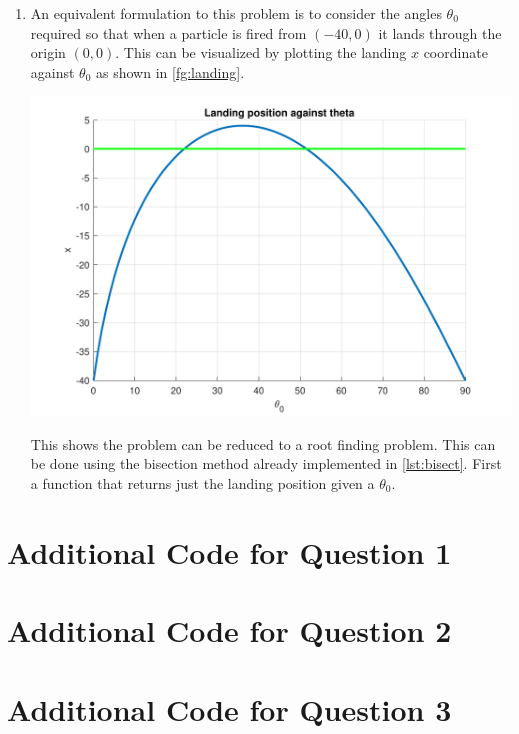 \documentclass[a4paper,11pt]{article}
\begin{document}
\begin{enumerate}
	\item An equivalent formulation to this problem is to consider the angles 
	$\theta_{0}$ required so that when a particle is fired from $(-40,0)$ it 
	lands through the origin $(0,0)$. This can be visualized by plotting the 
	landing $x$ coordinate against $\theta_{0}$ as shown in 
	\autoref{fg:landing}.
	\begin{center}
		\includegraphics[scale=0.7]{images/Q3f.pdf}
		\label{fg:landing}
	\end{center}
	This shows the problem can be reduced to a root finding problem. This can 
	be done using the bisection method already implemented in 
	\autoref{lst:bisect}. First a function that returns just the landing 
	position given a $\theta_{0}$.
\end{enumerate}

\newpage
\begin{appendices}
	\section{Additional Code for Question 1}
	\section{Additional Code for Question 2}
	\section{Additional Code for Question 3}
	
\end{appendices}
\end{document}
